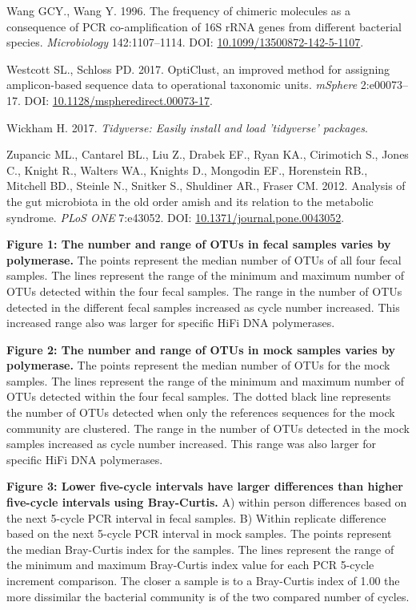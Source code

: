 \documentclass[11pt,]{article}
\begin{document}
\hypertarget{ref-Wang1996}{}
Wang GCY., Wang Y. 1996. The frequency of chimeric molecules as a
consequence of PCR co-amplification of 16S rRNA genes from different
bacterial species. \emph{Microbiology} 142:1107--1114. DOI:
\href{https://doi.org/10.1099/13500872-142-5-1107}{10.1099/13500872-142-5-1107}.

\hypertarget{ref-opticlust_Westcott_2017}{}
Westcott SL., Schloss PD. 2017. OptiClust, an improved method for
assigning amplicon-based sequence data to operational taxonomic units.
\emph{mSphere} 2:e00073--17. DOI:
\href{https://doi.org/10.1128/mspheredirect.00073-17}{10.1128/mspheredirect.00073-17}.

\hypertarget{ref-tidyverse_2017}{}
Wickham H. 2017. \emph{Tidyverse: Easily install and load 'tidyverse'
packages}.

\hypertarget{ref-Zupancic2012}{}
Zupancic ML., Cantarel BL., Liu Z., Drabek EF., Ryan KA., Cirimotich S.,
Jones C., Knight R., Walters WA., Knights D., Mongodin EF., Horenstein
RB., Mitchell BD., Steinle N., Snitker S., Shuldiner AR., Fraser CM.
2012. Analysis of the gut microbiota in the old order amish and its
relation to the metabolic syndrome. \emph{PLoS ONE} 7:e43052. DOI:
\href{https://doi.org/10.1371/journal.pone.0043052}{10.1371/journal.pone.0043052}.

\newpage

\textbf{Figure 1: The number and range of OTUs in fecal samples varies
by polymerase.} The points represent the median number of OTUs of all
four fecal samples. The lines represent the range of the minimum and
maximum number of OTUs detected within the four fecal samples. The range
in the number of OTUs detected in the different fecal samples increased
as cycle number increased. This increased range also was larger for
specific HiFi DNA polymerases.

\textbf{Figure 2: The number and range of OTUs in mock samples varies by
polymerase.} The points represent the median number of OTUs for the mock
samples. The lines represent the range of the minimum and maximum number
of OTUs detected within the four fecal samples. The dotted black line
represents the number of OTUs detected when only the references
sequences for the mock community are clustered. The range in the number
of OTUs detected in the mock samples increased as cycle number
increased. This range was also larger for specific HiFi DNA polymerases.

\textbf{Figure 3: Lower five-cycle intervals have larger differences
than higher five-cycle intervals using Bray-Curtis.} A) within person
differences based on the next 5-cycle PCR interval in fecal samples. B)
Within replicate difference based on the next 5-cycle PCR interval in
mock samples. The points represent the median Bray-Curtis index for the
samples. The lines represent the range of the minimum and maximum
Bray-Curtis index value for each PCR 5-cycle increment comparison. The
closer a sample is to a Bray-Curtis index of 1.00 the more dissimilar
the bacterial community is of the two compared number of cycles.
\end{document}
